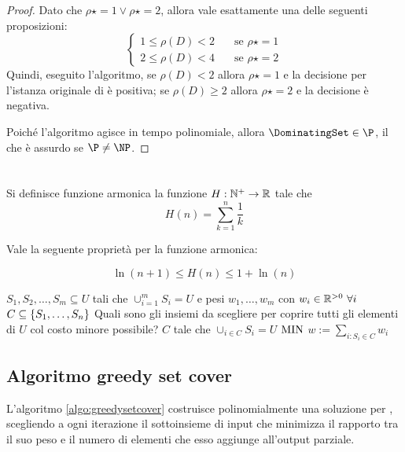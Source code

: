 \begin{proof}
	Dato che $\rho\star=1\lor\rho\star=2$, allora vale esattamente una delle seguenti proposizioni:
	\begin{equation*}
		\begin{cases}
			1\leq\rho(D)<2\quad & \text{se } \rho\star=1 \\
			2\leq\rho(D)<4\quad & \text{se } \rho\star=2
		\end{cases}
	\end{equation*}
	Quindi, eseguito l'algoritmo, se $\rho(D)<2$ allora $\rho\star=1$ e la decisione per l'istanza originale di \DominatingSet è positiva; se $\rho(D)\geq2$ allora $\rho\star=2$ e la decisione è negativa.

	Poiché l'algoritmo agisce in tempo polinomiale, allora $\DominatingSet\in\P$, il che è assurdo se $\P\neq\NP$.
\end{proof}



\section{\MinSetCover}\label{sec:SetCover}
Si definisce funzione armonica la funzione $H:\mathbb N^+\to\mathbb R$ tale che
\begin{equation*}
	H(n)=\sum_{k=1}^n \frac 1k
\end{equation*}

Vale la seguente proprietà per la funzione armonica:
\begin{theorem}
	\begin{equation*}
		\ln(n+1)\leq H(n)\leq 1+\ln(n)
	\end{equation*}
\end{theorem}

\popt{\MinSetCover}
{$S_1,S_2,\dots,S_m\subseteq U$ tali che $\cup_{i=1}^m S_i=U$ e pesi $w_1,\dots,w_m$ con $w_i \in\mathbb R^{>0}~\forall i$}
{$C\subseteq\left\{ S_1,\dots,S_n \right\}$}
{Quali sono gli insiemi da scegliere per coprire tutti gli elementi di $U$ col costo minore possibile?}
{$C$ tale che $\cup_{i\in C}S_i=U$}
{$\mathrm{MIN}$}
{$w:=\sum_{i:S_i\in C} w_i$}


\subsection{Algoritmo greedy set cover}
\begin{algorithm}[ht]
	\caption{\GreedySetCover}
	\label{algo:greedysetcover}
	
\end{algorithm}
L'algoritmo \ref{algo:greedysetcover} costruisce polinomialmente una soluzione per \MinSetCover, scegliendo a ogni iterazione il sottoinsieme di input che minimizza il rapporto tra il suo peso e il numero di elementi che esso aggiunge all'output parziale.

